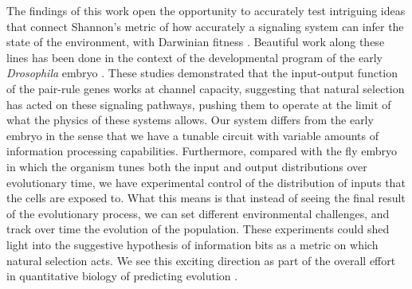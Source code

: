The findings of this work open the opportunity to accurately test intriguing
ideas that connect Shannon's metric of how accurately a signaling system can
infer the state of the environment, with Darwinian fitness \cite{Taylor2007a}.
Beautiful work along these lines has been done in the context of the
developmental program of the early {\it Drosophila} embryo \cite{Tkacik2008,
Petkova2016}. These studies demonstrated that the input-output function of the
pair-rule genes works at channel capacity, suggesting that natural selection has
acted on these signaling pathways, pushing them to operate at the limit of what
the physics of these systems allows. Our system differs from the early embryo in
the sense that we have a tunable circuit with variable amounts of information
processing capabilities. Furthermore, compared with the fly embryo in which the
organism tunes both the input and output distributions over evolutionary time,
we have experimental control of the distribution of inputs that the cells are
exposed to. What this means is that instead of seeing the final result of the
evolutionary process, we can set different environmental challenges, and track
over time the evolution of the population. These experiments could shed light
into the suggestive hypothesis of information bits as a metric on which natural
selection acts. We see this exciting direction as part of the overall effort in
quantitative biology of predicting evolution \cite{Lassig2017}.
